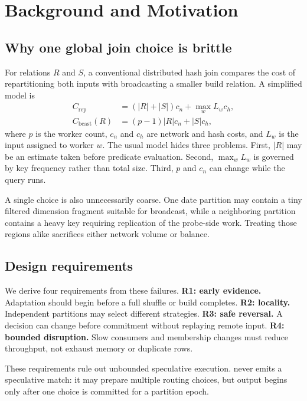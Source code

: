 \section{Background and Motivation}
\label{sec:background}

\subsection{Why one global join choice is brittle}

For relations $R$ and $S$, a conventional distributed hash join compares the
cost of repartitioning both inputs with broadcasting a smaller build relation.
A simplified model is
\begin{align}
 C_{\mathrm{rep}} &= (|R|+|S|)c_n + \max_w L_w c_h, \\
 C_{\mathrm{bcast}}(R) &= (p-1)|R|c_n + |S|c_h,
 \label{eq:costs}
\end{align}
where $p$ is the worker count, $c_n$ and $c_h$ are network and hash costs, and
$L_w$ is the input assigned to worker $w$.  The usual model hides three
problems.  First, $|R|$ may be an estimate taken before predicate evaluation.
Second, $\max_w L_w$ is governed by key frequency rather than total size.
Third, $p$ and $c_n$ can change while the query runs.

A single choice is also unnecessarily coarse.  One date partition may contain
a tiny filtered dimension fragment suitable for broadcast, while a neighboring
partition contains a heavy key requiring replication of the probe-side work.
Treating those regions alike sacrifices either network volume or balance.

\subsection{Design requirements}

We derive four requirements from these failures.  \textbf{R1: early evidence.}
Adaptation should begin before a full shuffle or build completes.  \textbf{R2:
locality.} Independent partitions may select different strategies.
\textbf{R3: safe reversal.} A decision can change before commitment without
replaying remote input.  \textbf{R4: bounded disruption.} Slow consumers and
membership changes must reduce throughput, not exhaust memory or duplicate
rows.

These requirements rule out unbounded speculative execution.  \system{} never
emits a speculative match: it may prepare multiple routing choices, but output
begins only after one choice is committed for a partition epoch.
